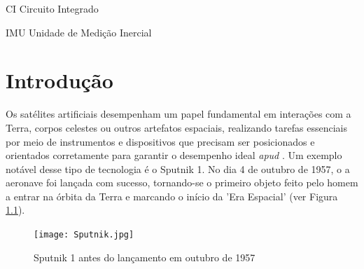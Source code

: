 \documentclass[
	12pt,				%
	openright,			%
	oneside,			%
	a4paper,			%
	english,			%
	brazil				%
	]{abntex2}
\begin{document}
\listoffigures*
\cleardoublepage

\listoftables*
\cleardoublepage


\begin{siglas}
  \item[CI] Circuito Integrado 
  \item[IMU] Unidade de Medição Inercial
\end{siglas}

  

\tableofcontents*
\cleardoublepage


\makeatletter
{}
\makeatother




\textual


\chapter[Introdução]{Introdução}



Os satélites artificiais desempenham um papel fundamental em interações com a Terra, corpos celestes ou outros artefatos espaciais, realizando tarefas essenciais por meio de instrumentos e dispositivos que precisam ser posicionados e orientados corretamente para garantir o desempenho ideal \cite{shuster1993} \textit{apud} \cite{ferreira2008}. Um exemplo notável desse tipo de tecnologia é o Sputnik 1. No dia 4 de outubro de 1957, o a aeronave foi lançada com sucesso, tornando-se o primeiro objeto feito pelo homem a entrar na órbita da Terra e marcando o início da 'Era Espacial' (ver Figura \ref{fig:sputnik}). 

\begin{figure}[h]
	\centering
	\texttt{[image: Sputnik.jpg]} %
	\caption[Sputnik 1 antes do lançamento em outubro de 1957]{Sputnik 1 antes do lançamento em outubro de 1957}
	\label{fig:sputnik}
\end{figure}
\end{document}
